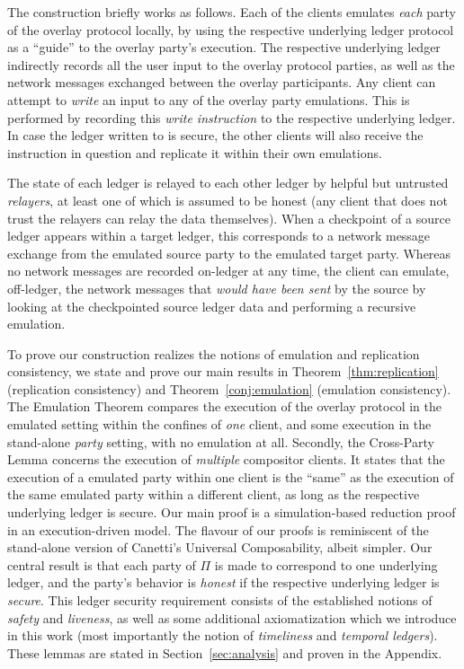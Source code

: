 The construction briefly works as follows.
Each of the \rollerblade clients emulates \emph{each} party of the overlay
protocol locally, by using the respective underlying ledger protocol
as a ``guide'' to the overlay party's execution.
The respective underlying ledger indirectly records all the
user input to the overlay protocol parties, as well as the network
messages exchanged between the overlay participants.
Any \rollerblade client can attempt to \emph{write} an input to any
of the overlay party emulations. This is performed by recording this
\emph{write instruction} to the respective underlying ledger. In case
the ledger written to is secure, the other \rollerblade clients will
also receive the instruction in question and replicate it within their
own emulations.

The
state of each ledger is relayed to each other ledger by helpful but
untrusted \emph{relayers}, at least one of which is assumed to be honest
(any \rollerblade client that does not trust the relayers can relay
the data themselves). When a checkpoint of a source ledger
appears within a target ledger, this corresponds to a network message
exchange from the emulated source party to the emulated target party.
Whereas no network messages are recorded on-ledger at any time,
the \rollerblade client can emulate, off-ledger, the network messages that
\emph{would have been sent} by the source by looking at the checkpointed
source ledger data and performing a recursive emulation.

To prove our construction realizes the notions of emulation and replication consistency,
we state and prove our main results in Theorem~\ref{thm:replication} (replication consistency)
and Theorem~\ref{conj:emulation} (emulation consistency).
The Emulation Theorem compares the execution
of the overlay protocol in the emulated setting within the confines of
\emph{one} \rollerblade client, and
some execution in the stand-alone \emph{party} setting, with no emulation at all.
Secondly, the Cross-Party Lemma concerns the execution of \emph{multiple}
compositor clients. It states that the execution of a emulated party
within one client is the ``same'' as the execution of the
same emulated party within a different client, as long
as the respective underlying ledger is secure.
Our main proof is a simulation-based
reduction proof in an execution-driven model. The flavour of our proofs is reminiscent of the
stand-alone version of Canetti's Universal Composability, albeit simpler. Our central result
is that each party of $\Pi$ is made to correspond to one underlying ledger, and the party's
behavior is \emph{honest} if the respective underlying ledger is \emph{secure}. This ledger
security requirement consists of the established notions of \emph{safety} and \emph{liveness},
as well as some additional axiomatization which we introduce in this work (most importantly
the notion of \emph{timeliness} and \emph{temporal ledgers}).
These lemmas are stated in Section~\ref{sec:analysis} and proven in the Appendix.

